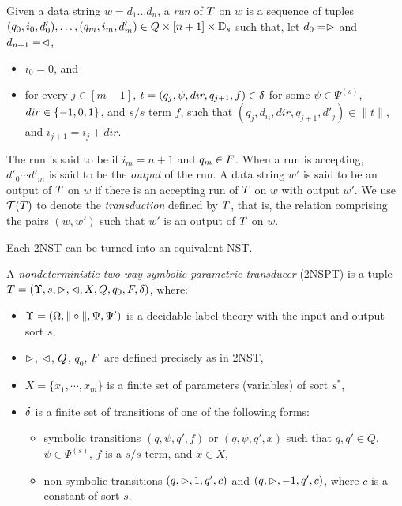Given a data string $w = d_1 \dots d_n$, a \emph{run} of $T$ on $w$
is a sequence of tuples $(q_0, i_0, d'_0), \ldots, (q_m, i_m, d'_m) \in Q \times [n+1] \times \mathbb{D}_s$ 
such that, let $d_0 = \vartriangleright$ and $d_{n+1} = \vartriangleleft$, %
\begin{itemize}
    \item $i_0 = 0$, and
    \item for every $j \in [m-1]$, $t=(q_j, \psi, dir, q_{j+1}, f) \in \delta$ for some $\psi \in \Psi^{(s)}$, $dir \in \{-1, 0, 1\}$, and $s/s$ term $f$, such that $(q_j, d_{i_j}, dir, q_{j+1}, d'_j) \in \|t\|$, and $i_{j+1} = i_j + dir$.
\end{itemize}
The run is said to be  if $i_m = n+1$ and $q_m \in F$. When a run is accepting, $d'_0 \cdots d'_m$ is said to be the \emph{output} of the run.
A data string $w'$ is said to be an output of $T$ on $w$ if there is an accepting run of
$T$ on $w$ with output $w'$. We use $\mathcal{T}(T)$ to denote the \emph{transduction} defined by $T$, that is, the relation comprising the pairs $(w, w')$ such that $w'$ is an output of $T$ on $w$.

\begin{proposition}
Each 2NST can be turned into an equivalent NST. 
\end{proposition}


\begin{definition}
A \emph{nondeterministic two-way symbolic parametric transducer} (2NSPT) is a tuple
$T=(\Upsilon, s,  \vartriangleright, \vartriangleleft, X, Q, q_0, F, \delta)$, where:
\begin{itemize}
\item $\Upsilon=(\Omega, \| \circ \|, \Psi, \Psi')$ is a decidable label theory with the input and output sort $s$,
%
\item $\vartriangleright$, $\vartriangleleft$, $Q$, $q_0$, $F$ are defined precisely as in 2NST, 
%
\item $X=\{x_1,\cdots, x_m\}$ is a finite set of parameters (variables) of sort $s^*$, 
%
\item $\delta$ is a finite set of transitions of one of the following forms: 
\begin{itemize}
\item symbolic transitions $(q, \psi, q', f)$ or $(q, \psi, q', x)$ such that $q,q' \in Q$, $\psi \in \Psi^{(s)}$,
$f$ is a $s/s$-term, and $x \in X$,
%
\item non-symbolic transitions $(q, \vartriangleright, 1, q', c)$ and $(q, \vartriangleright, -1, q', c)$, where $c$ is a constant of sort $s$. 
\end{itemize}
\end{itemize}
\end{definition}


